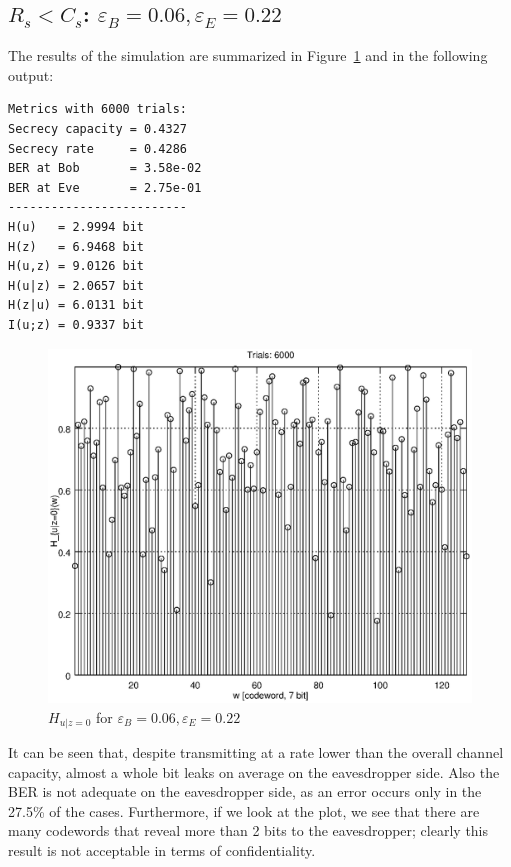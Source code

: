 \documentclass[a4paper,12pt,titlepage]{article}
\begin{document}
\subsection*{$R_s < C_s$: $\varepsilon_B = 0.06, \varepsilon_E = 0.22$}
The results of the simulation are summarized in Figure~\ref{fig:bsc_0.6_0.22} and
in the following output:
\begin{verbatim}
Metrics with 6000 trials:
Secrecy capacity = 0.4327
Secrecy rate     = 0.4286
BER at Bob       = 3.58e-02
BER at Eve       = 2.75e-01
-------------------------
H(u)   = 2.9994 bit
H(z)   = 6.9468 bit
H(u,z) = 9.0126 bit
H(u|z) = 2.0657 bit
H(z|u) = 6.0131 bit
I(u;z) = 0.9337 bit
\end{verbatim}

\begin{figure}[h]
  \centering
  \includegraphics[scale=0.8]{bsc__0_060_0_220__6000.eps}
  \caption{$H_{u|z=0}$ for $\varepsilon_B = 0.06, \varepsilon_E = 0.22$}
  \label{fig:bsc_0.6_0.22}
\end{figure}

It can be seen that, despite transmitting at a rate lower than the overall
channel capacity, almost a whole bit leaks on average on the eavesdropper side.
Also the BER is not adequate on the eavesdropper side, as an error occurs only
in the 27.5\% of the cases. Furthermore, if we look at the plot, we see that
there are many codewords that reveal more than 2 bits to the eavesdropper;
clearly this result is not acceptable in terms of confidentiality.
\end{document}
